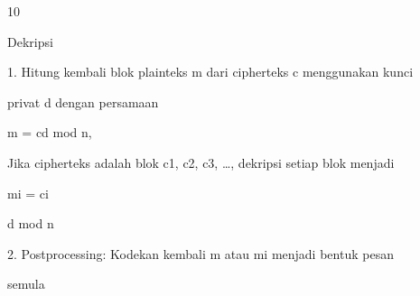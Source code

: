 \documentclass{article}
\begin{document}

10

Dekripsi

1.  Hitung kembali blok plainteks m dari cipherteks c menggunakan kunci 

privat d dengan persamaan 

                   m = cd mod n,

       Jika cipherteks adalah blok c1, c2,  c3, …, dekripsi setiap blok menjadi

                   mi = ci

d mod n

2. Postprocessing: Kodekan kembali m atau mi menjadi bentuk pesan 

semula
\end{document}
